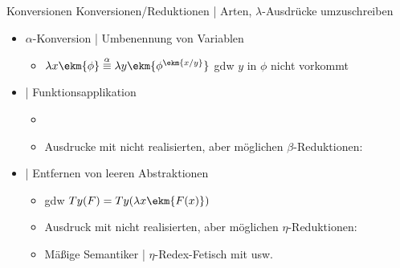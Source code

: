\begin{frame}
  {Konversionen}
  \onslide<+->
  \onslide<+->
  \alert{Konversionen\slash Reduktionen} | Arten, $\lambda$-Ausdrücke umzuschreiben\\
  \Halbzeile
  \begin{itemize}[<+->]
    \item \alert{$\alpha$-Konversion} | Umbenennung von Variablen
      \begin{itemize}[<+->]
        \item \alert{$\lambda x\ekm{\phi}\stackrel{\alpha}{\equiv}\lambda y\ekm{\phi^{\ekm{x/y}}}$} gdw $y$ in $\phi$ nicht vorkommt
      \end{itemize}
      \Halbzeile
    \item {} | Funktionsapplikation
      \begin{itemize}[<+->]
        \item {}
        \item Ausdrucke mit nicht realisierten, aber möglichen $\beta$-Reduktionen: 
      \end{itemize}
      \Halbzeile
    \item {} | Entfernen von leeren Abstraktionen
      \begin{itemize}[<+->]
        \item {} gdw $Ty(F)=Ty(\lambda x\ekm{F(x)})$ 
        \item Ausdruck mit nicht realisierten, aber möglichen $\eta$-Reduktionen: 
        \item Mäßige Semantiker | $\eta$-Redex-Fetisch mit  usw.
      \end{itemize}
  \end{itemize}
\end{frame}


